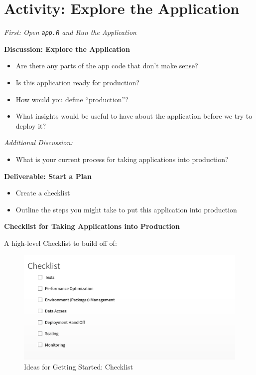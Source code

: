\documentclass[]{book}
\providecommand{\tightlist}{%
  \setlength{\itemsep}{0pt}\setlength{\parskip}{0pt}}
\theoremstyle{definition}
\theoremstyle{definition}
\theoremstyle{definition}
\theoremstyle{remark}
\begin{document}
\hypertarget{activity-explore-the-application}{%
\section{Activity: Explore the
Application}\label{activity-explore-the-application}}

\emph{First: Open \texttt{app.R} and Run the Application}

\textbf{Discussion: Explore the Application}

\begin{itemize}
\tightlist
\item
  Are there any parts of the app code that don't make sense?
\item
  Is this application ready for production?
\item
  How would you define ``production''?
\item
  What insights would be useful to have about the application before we
  try to deploy it?
\end{itemize}

\emph{Additional Discussion:}

\begin{itemize}
\tightlist
\item
  What is your current process for taking applications into production?
\end{itemize}

\textbf{Deliverable: Start a Plan}

\begin{itemize}
\tightlist
\item
  Create a checklist
\item
  Outline the steps you might take to put this application into
  production
\end{itemize}

\textbf{Checklist for Taking Applications into Production}

A high-level Checklist to build off of:

\begin{figure}
\centering
\includegraphics{imgs/app-intro/skeleton-checklist.png}
\caption{Ideas for Getting Started: Checklist}
\end{figure}
\end{document}
